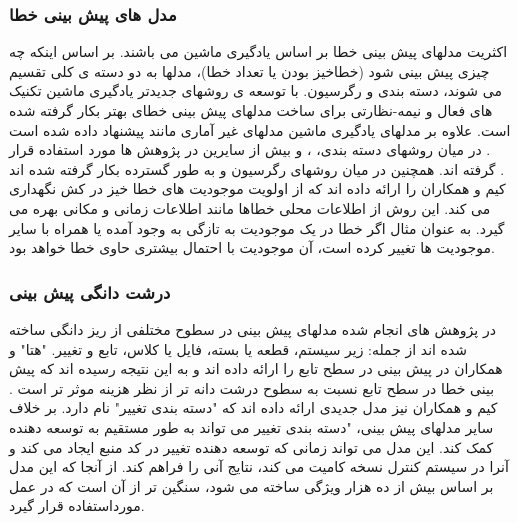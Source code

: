 \subsubsection{مدل های پیش بینی خطا}
اکثریت مدلهای پیش بینی خطا بر اساس یادگیری ماشین می باشند. بر اساس اینکه چه چیزی پیش بینی شود (خطاخیز بودن یا تعداد خطا)، مدلها به دو دسته ی کلی تقسیم می شوند، دسته بندی و رگرسیون. با توسعه ی روشهای جدیدتر یادگیری ماشین تکنیک های فعال و نیمه-نظارتی  برای ساخت مدلهای پیش بینی خطای بهتر بکار گرفته شده است\cite{li2012sample}. علاوه بر مدلهای یادگیری ماشین مدلهای غیر آماری مانند  پیشنهاد داده شده است \cite{kim2007predicting}. در میان روشهای دسته بندی، 
 ،
 و
بیش از سایرین در پژوهش ها مورد استفاده قرار گرفته اند. همچنین در میان روشهای رگرسیون 
 و 
به طور گسترده بکار گرفته شده اند \cite{nam2014survey}. \\
کیم و همکاران  را ارائه داده اند که از اولویت موجودیت های خطا خیز در کش نگهداری می کند. این روش از اطلاعات محلی خطاها مانند اطلاعات زمانی و مکانی بهره می گیرد. به عنوان مثال اگر خطا در یک موجودیت به تازگی به وجود آمده یا همراه با سایر موجودیت ها تغییر کرده است، آن موجودیت با احتمال بیشتری حاوی خطا خواهد بود. 
\subsubsection{درشت دانگی پیش بینی }
در پژوهش های انجام شده مدلهای پیش بینی در سطوح مختلفی از ریز دانگی ساخته شده اند از جمله: زیر سیستم، قطعه یا بسته، فایل یا کلاس، تابع و تغییر. "هتا" و همکاران در پیش بینی در سطح تابع را ارائه داده اند و به این نتیجه رسیده اند که پیش بینی خطا در سطح تابع نسبت به سطوح درشت دانه تر از نظر هزینه موثر تر است \cite{hata2012bug}. کیم و همکاران نیز مدل جدیدی ارائه داده اند که "دسته بندی تغییر"  نام دارد. بر خلاف سایر مدلهای پیش بینی، "دسته بندی تغییر می تواند به طور مستقیم به توسعه دهنده کمک کند. این مدل می تواند زمانی که توسعه دهنده تغییر در کد منبع ایجاد می کند و آنرا در سیستم کنترل نسخه کامیت می کند، نتایج آنی را فراهم کند.  از آنجا که این مدل بر اساس بیش از ده هزار ویژگی ساخته می شود، سنگین تر از آن است که در عمل مورداستفاده قرار گیرد\cite{kim2008classifying}. 


